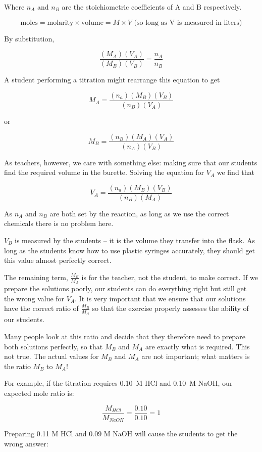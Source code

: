 Where $ n_{A} $ and $ n_{B} $ are the stoichiometric coefficients of A and B respectively.

\[ \mathrm{moles} = \mathrm{molarity} \times \mathrm{volume} = M \times V \mbox{ (so long as V is measured in liters)} \]

By substitution,

\[ \frac{(M_{A})(V_{A})}{(M_{B})(V_{B})} = \frac{n_{A}}{n_{B}} \]

A student performing a titration might rearrange this equation to get

\[ M_{A} = \frac{(n_{a})(M_{B})(V_{B})}{(n_{B})(V_{A})} \]

or

\[ M_{B} = \frac{(n_{B})(M_{A})(V_{A})}{(n_{A})(V_{B})} \]

As teachers, however, we care with something else: making sure that our students find the required volume in the burette. Solving the equation for $ V_{A} $ we find that

\[ V_{A} = \frac{(n_{a})(M_{B})(V_{B})}{(n_{B})(M_{A})} \]

As $ n_{A} $ and $ n_{B} $ are both set by the reaction, as long as we use the correct chemicals there is no problem here.

$ V_{B} $ is measured by the students -- it is the volume they transfer into the flask. As long as the students know how to use plastic syringes accurately, they should get this value almost perfectly correct.

The remaining term, $ \frac{M_{B}}{M_{A}} $ is for the teacher, not the student, to make correct. If we prepare the solutions poorly, our students can do everything right but still get the wrong value for $ V_{A} $. It is very important that we ensure that our solutions have the correct ratio of $ \frac{M_{B}}{M_{A}} $ so that the exercise properly assesses the ability of our students.

Many people look at this ratio and decide that they therefore need to prepare both solutions perfectly, so that $ M_{B} $ and $ M_{A} $ are exactly what is required. This not true. The actual values for $ M_{B} $ and $ M_{A} $ are not important; what matters is the ratio $ M_{B} $ to $ M_{A} $!

For example, if the titration requires 0.10~M HCl and 0.10~M NaOH, our expected mole ratio is:

\[ \frac{M_{HCl}}{M_{NaOH}} = \frac{0.10}{0.10} = 1 \]

Preparing 0.11 M HCl and 0.09 M NaOH will cause the students to get the wrong answer:

